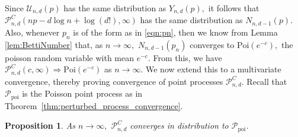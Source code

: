 \documentclass[12pt]{amsart}
\newcommand{\Poi}{\text{Poi}}
\newcommand{\PoiP}{\mathscr{P}_{\text{poi}}}
\newcommand{\PoiF}{\mathscr{P}_{n, d}^{C}}
\newcommand{\gt}[1]{\textcolor{blue}{#1}}
\newcommand{\remove}[1]{}
\renewcommand{\gt}[1]{#1}
\newtheorem{prop}[theorem]{Proposition}
\numberwithin{equation}{section}
\numberwithin{theorem}{section}
\newcommand{\1}{\mathbf{1}}
\def\U{\mathcal{U}}
\begin{document}
Since $\U_{n, d}(p)$ has the same distribution as $Y_{n, d}(p),$ it follows that $\PoiF(np - d\log n + \log(d!),\infty)$ has the same distribution as $N_{n, d - 1}(p).$  Also, whenever $p_n$ is of the form as in \eqref{eqn:pn}, then we know from Lemma \ref{lem:BettiNumber} that, as $n \to \infty,$ $N_{n, d - 1}(p_n)$ converges to  $\Poi(e^{-c}),$ the poisson random variable with mean $e^{-c}.$ From this, we have $\PoiF(c, \infty) \Rightarrow \Poi(e^{-c})$ as $n \to \infty.$ We now extend this to a multivariate convergence, thereby proving convergence of point processes $\PoiF$. Recall that  $\PoiP$ is the Poisson point process as in Theorem~\ref{thm:perturbed_process_convergence}.
%
\begin{prop}
\label{thm:FacesPoissonProcessConvergence}
\gt{As $n \to \infty,$} \remove{with $p_n$ as in \eqref{eqn:pn},} $\PoiF$ converges in distribution to $\PoiP$.
\end{prop}
\end{document}
